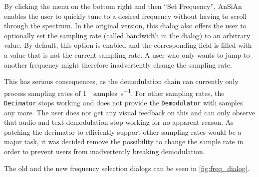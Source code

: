 By clicking the menu on the bottom right and then ``Set Frequency'', \ac{AnSiAn} enables the user to quickly tune to a desired frequency without having to scroll through the spectrum. In the original version, this dialog also offers the user to optionally set the sampling rate (called bandwidth in the dialog) to an arbitrary value. By default, this option is enabled and the corresponding field is filled with a value that is not the current sampling rate. A user who only wants to jump to another frequency might therefore inadvertently change the sampling rate.

This has serious consequences, as the demodulation chain can currently only process sampling rates of \SI{1}{\mega{}samples\per\second}. For other sampling rates, the \texttt{Decimator} stops working and does not provide the \texttt{Demodulator} with samples any more. The user does not get any visual feedback on this and can only observe that audio and text demodulation stop working for no apparent reason. As patching the decimator to efficiently support other sampling rates would be a major task, it was decided remove the possibility to change the sample rate in order to prevent users from inadvertently breaking demodulation.

The old and the new frequency selection dialogs can be seen in \autoref{fig:freq_dialog}.
